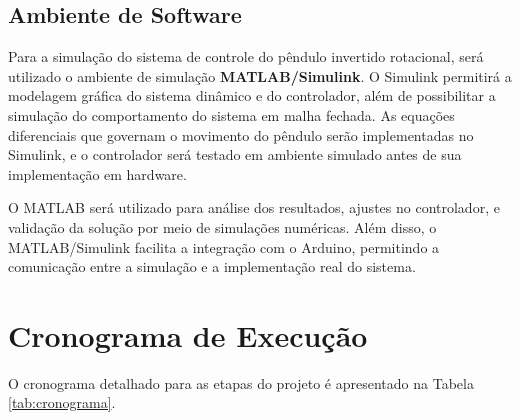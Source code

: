 \documentclass[9pt,a4paper,twocolumn,twoside]{tau-class/tau}
\begin{document}
\vspace{-6mm}


\subsection{Ambiente de Software}

    Para a simulação do sistema de controle do pêndulo invertido rotacional, será utilizado o ambiente de simulação \textbf{MATLAB/Simulink}. O Simulink permitirá a modelagem gráfica do sistema dinâmico e do controlador, além de possibilitar a simulação do comportamento do sistema em malha fechada. As equações diferenciais que governam o movimento do pêndulo serão implementadas no Simulink, e o controlador será testado em ambiente simulado antes de sua implementação em hardware.

    O MATLAB será utilizado para análise dos resultados, ajustes no controlador, e validação da solução por meio de simulações numéricas. Além disso, o MATLAB/Simulink facilita a integração com o Arduino, permitindo a comunicação entre a simulação e a implementação real do sistema.


\section{Cronograma de Execução}

    O cronograma detalhado para as etapas do projeto é apresentado na Tabela \ref{tab:cronograma}.

\begin{table}[H]
    \centering
    \caption{Cronograma de execução do projeto.}
    \label{tab:cronograma}
\end{table}

\vspace{-6mm} %
\end{document}
